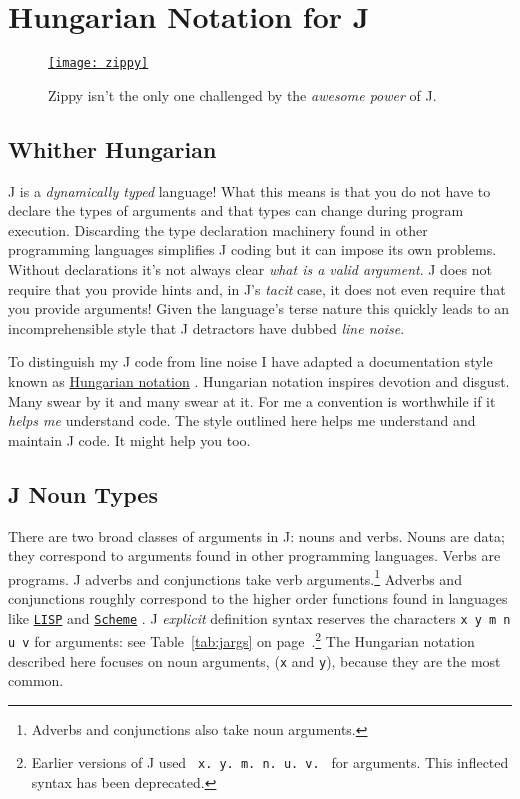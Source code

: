 \section{Hungarian Notation for J}\label{ap:jodhung}
   
\begin{figure}[htbp]
  \centering
  \href{http://www.zippythepinhead.com/}{\texttt{[image: zippy]}}
  \caption[Zippy the Pinhead]{Zippy \cite{zippy} isn't the only one challenged by the \emph{awesome power} of J.}
  \label{eps:zippy}
\end{figure}

\subsection{Whither Hungarian}

J is a \emph{dynamically typed} language!  What this means is that
you do not have to declare the types of arguments and that types
can change during program execution.  Discarding the 
type declaration machinery found in other programming languages simplifies
J coding but it can impose its own problems. Without declarations
it's not always clear \emph{what is a valid argument}.  J does
not require that you provide hints and, in J's \emph{tacit} case, it
does not even require that you provide arguments!  Given
the language's terse nature this quickly leads to an incomprehensible
style that J detractors have dubbed \emph{line noise}. 

To distinguish my J code from line noise I have adapted a documentation
style known as \href{http://en.wikipedia.org/wiki/Hungarian_notation}{Hungarian notation} \cite{wiki:hung}. 
 Hungarian notation inspires devotion and disgust.  Many swear by it and many
 swear at it.  For me a
convention is worthwhile if it \emph{helps me} understand code.  The style
outlined here helps me understand and maintain J code.  It might help you too.

\subsection{J Noun Types}

There are two broad classes of arguments in J: nouns and verbs.  Nouns are data;
they correspond to arguments found in other programming languages.  Verbs are programs.  J adverbs
and conjunctions take verb arguments.\footnote{Adverbs and conjunctions also take noun
arguments.} Adverbs and conjunctions roughly correspond to the
higher order functions found in languages like
\href{http://www.cs.cmu.edu/Groups/AI/html/cltl/cltl2.html}{\texttt{LISP}} \cite{commonlisp} and
\href{http://www-swiss.ai.mit.edu/projects/scheme/}{\texttt{Scheme}} \cite{scheme}. 
J \emph{explicit} definition syntax reserves the characters \texttt{x y m n
u v} for arguments: see Table~\ref{tab:jargs} on page~\pageref{tab:jargs}.\footnote{
Earlier versions of J used  \texttt{ x.\ y.\ m.\ n.\ u.\ v.\ } for arguments.  This inflected
syntax has been deprecated.} The Hungarian notation described here focuses on noun arguments, 
(\texttt{x} and \texttt{y}), because they are the most common.

